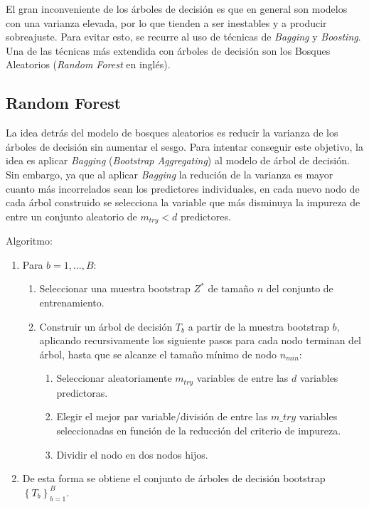 \documentclass[12pt,a4paper,]{book}
\providecommand{\tightlist}{%
  \setlength{\itemsep}{0pt}\setlength{\parskip}{0pt}}
\numberwithin{dummy}{section}
\theoremstyle{ocrenumbox}
\theoremstyle{blacknumex}
\theoremstyle{blacknumbox}
\theoremstyle{ocrenum}
\theoremstyle{ocrenum}
\begin{document}
El gran inconveniente de los árboles de decisión es que en general son
modelos con una varianza elevada, por lo que tienden a ser inestables y
a producir sobreajuste. Para evitar esto, se recurre al uso de técnicas
de \emph{Bagging} y \emph{Boosting}. Una de las técnicas más extendida
con árboles de decisión son los Bosques Aleatorios (\emph{Random Forest}
en inglés).

\hypertarget{random-forest}{%
\subsection{Random Forest}\label{random-forest}}

La idea detrás del modelo de bosques aleatorios es reducir la varianza
de los árboles de decisión sin aumentar el sesgo. Para intentar
conseguir este objetivo, la idea es aplicar \emph{Bagging}
(\emph{Bootstrap Aggregating}) al modelo de árbol de decisión. Sin
embargo, ya que al aplicar \emph{Bagging} la redución de la varianza es
mayor cuanto más incorrelados sean los predictores individuales, en cada
nuevo nodo de cada árbol construido se selecciona la variable que más
disminuya la impureza de entre un conjunto aleatorio de \(m_{try} < d\)
predictores.

Algoritmo:

\begin{enumerate}
\def\labelenumi{\arabic{enumi}.}
\item
  Para \(b = {1,...,B}:\)

  \begin{enumerate}
  \def\labelenumii{\alph{enumii})}
  \item
    Seleccionar una muestra bootstrap \(Z^*\) de tamaño \(n\) del
    conjunto de entrenamiento.
  \item
    Construir un árbol de decisión \(T_b\) a partir de la muestra
    bootstrap \(b\), aplicando recursivamente los siguiente pasos para
    cada nodo terminan del árbol, hasta que se alcanze el tamaño mínimo
    de nodo \(n_{min}:\)

    \begin{enumerate}
    \def\labelenumiii{\roman{enumiii}.}
    \tightlist
    \item
      Seleccionar aleatoriamente \(m_{try}\) variables de entre las
      \(d\) variables predictoras.
    \item
      Elegir el mejor par variable/división de entre las \(m\_try\)
      variables seleccionadas en función de la reducción del criterio de
      impureza.
    \item
      Dividir el nodo en dos nodos hijos.
    \end{enumerate}
  \end{enumerate}
\item
  De esta forma se obtiene el conjunto de árboles de decisión bootstrap
  \(\left\{ T_b \right\}_{b=1}^B\).
\end{enumerate}
\end{document}
